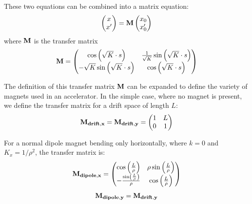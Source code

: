 \documentclass[11pt]{report}
\begin{document}
These two equations can be combined into a matrix equation:
\begin{equation}
  \begin{pmatrix}
    x \\
    x'
  \end{pmatrix}
  =
  \bf{M}
  \begin{pmatrix}
    x_0 \\
    x'_0
  \end{pmatrix}
\end{equation}
where $\bf{M}$ is the transfer matrix
\begin{equation}
  \bf{M}=
  \begin{pmatrix}
    \cos\left(\sqrt{K}\cdot s\right) & \frac1{\sqrt{K}}\sin\left(\sqrt{K}\cdot s\right) \\
    -\sqrt{K}\sin\left(\sqrt{K}\cdot s\right) & \cos\left(\sqrt{K}\cdot s\right)
  \end{pmatrix}
\end{equation}

The definition of this transfer matrix $\bf M$ can be expanded to define the variety of magnets used in an accelerator. In the simple case, where no magnet is present, we define the transfer matrix for a drift space of length $L$:
\begin{equation}
  \bf{M}_{drift,x}=\bf{M}_{drift,y}=
  \begin{pmatrix}
    1 & L \\
    0 & 1
  \end{pmatrix}
\end{equation}

For a normal dipole magnet bending only horizontally, where $k=0$ and $K_x=1/\rho^2$, the transfer matrix is:
\begin{equation}
  \bf{M}_{dipole,x}=
  \begin{pmatrix}
    \cos\left(\frac L\rho\right) & \rho\sin\left(\frac L\rho\right) \\
    -\frac{\sin\left(\frac L\rho\right)}{\rho} & \cos\left(\frac L\rho\right)
  \end{pmatrix}
\end{equation}
\begin{equation}
  \bf{M}_{dipole,y}=\bf{M}_{drift,y}
\end{equation}
\end{document}
